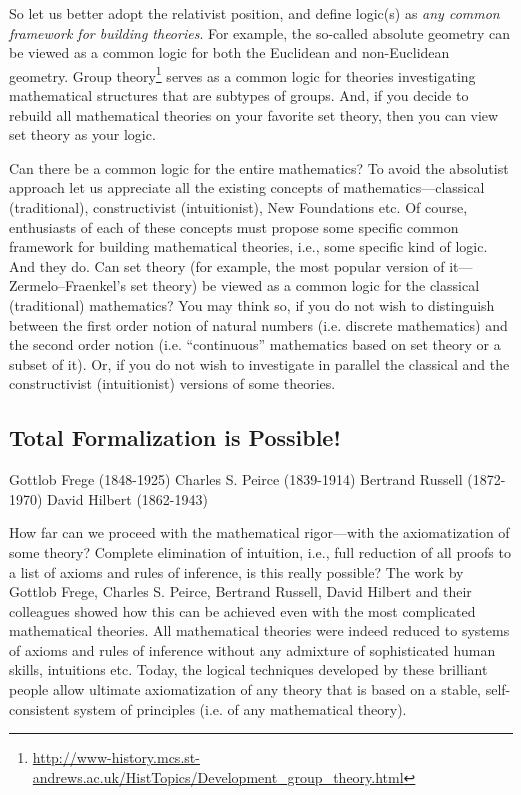 So let us better adopt the relativist position, and define logic(s) as \emph{any common framework for building theories}.
For example, the so-called absolute geometry can be viewed as a common logic for both the Euclidean and non-Euclidean geometry.
Group theory\footnote{\url{http://www-history.mcs.st-andrews.ac.uk/HistTopics/Development\_group\_theory.html}} serves as a common logic for theories investigating mathematical structures that are subtypes of groups.
And, if you decide to rebuild all mathematical theories on your favorite set theory, then you can view set theory as your logic.

Can there be a common logic for the entire mathematics?
To avoid the absolutist approach let us appreciate all the existing concepts of mathematics---classical (traditional), constructivist (intuitionist), New Foundations etc.
Of course, enthusiasts of
each of these concepts must propose some specific common framework for building mathematical theories, i.e., some specific kind of logic.
And they do.
Can set theory (for example, the most popular version of it---Zermelo--Fraenkel's set theory) be viewed as a common logic for the classical (traditional) mathematics?
You may think so, if you do not wish to distinguish between the first order notion of natural numbers (i.e. discrete mathematics) and the second order notion (i.e. ``continuous'' mathematics based on set theory or a subset of it).
Or, if you do not wish to investigate in parallel the classical and the constructivist (intuitionist) versions of some theories.

\subsection{Total Formalization is Possible!}
Gottlob Frege (1848-1925)
Charles S. Peirce (1839-1914)
Bertrand Russell (1872-1970)
David Hilbert (1862-1943)

How far can we proceed with the mathematical rigor---with the axiomatization of some theory?
Complete elimination of intuition, i.e., full reduction of all proofs to a list of axioms and rules of inference, is this really possible?
The work by Gottlob Frege, Charles S. Peirce, Bertrand Russell, David Hilbert and their colleagues showed how this can be achieved even with the most complicated mathematical theories.
All mathematical theories were indeed reduced to systems of axioms and rules of inference without any admixture of sophisticated human skills, intuitions etc.
Today, the logical techniques developed by these brilliant people allow ultimate axiomatization of any theory that is based on a stable, self-consistent system of principles (i.e. of any mathematical theory).

